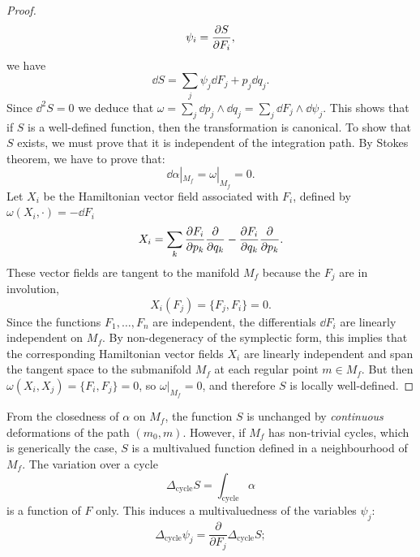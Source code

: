 \begin{proof}
    \begin{equation}
        \psi_i = \pdv{S}{F_i},
    \end{equation}
    we have
    \begin{equation}
        \dd{S} = \sum_j \psi_j \dd{F_j} + p_j \dd{q_j}.
    \end{equation}
    Since $\dd^2 S = 0$ we deduce that $\omega = \sum_j \dd{p_j} \wedge \dd{q_j} = \sum_j \dd{F_j} \wedge \dd{\psi_j}$.
    This shows that if $S$ is a well-defined function, then the transformation is canonical.
    To show that $S$ exists, we must prove that it is independent of the integration path. By Stokes theorem, we have to prove that:
    \begin{equation}
        \dd{\alpha}|_{M_f} = \omega|_{M_f} = 0.
    \end{equation}
    Let $X_i$ be the Hamiltonian vector field associated with $F_i$, defined by $\omega(X_i, \cdot) = - \dd F_i$
    \begin{equation}
        X_i = \sum_k  \pdv{F_i}{p_k} \pdv{}{q_k} - \pdv{F_i}{q_k} \pdv{}{p_k}.
    \end{equation}
    These vector fields are tangent to the manifold $M_f$ because the $F_j$ are in involution,
    \begin{equation}
        X_i(F_j) = \{F_j, F_i\} = 0.
    \end{equation}
    Since the functions $F_1, \dots, F_n$ are independent, the differentials $\dd F_i$ are linearly independent on $M_f$. 
    By non-degeneracy of the symplectic form, this implies that the corresponding Hamiltonian vector fields $X_i$ are linearly independent and span the tangent space to the submanifold $M_f$ at each regular point $m \in M_f$. 
    But then $\omega(X_i, X_j) = \{F_i, F_j\} = 0$, so $\omega|_{M_f} = 0$, and therefore $S$ is locally well-defined.
\end{proof}
\begin{remark}
    From the closedness of $\alpha$ on $M_f$, the function $S$ is unchanged by \emph{continuous} deformations of the path $(m_0, m)$. However, if $M_f$ has non-trivial cycles, which is generically the case, $S$ is a multivalued function defined in a neighbourhood of $M_f$.
    The variation over a cycle
    \begin{equation}
        \Delta_{\text{cycle}} S = \int_{\text{cycle}} \alpha
    \end{equation}
    is a function of $F$ only. This induces a multivaluedness of the variables 
    $\psi_j$:
    \begin{equation}
        \Delta_{\text{cycle}} \psi_j = \frac{\partial}{\partial F_j} 
        \Delta_{\text{cycle}} S;
    \end{equation}
\end{remark}
